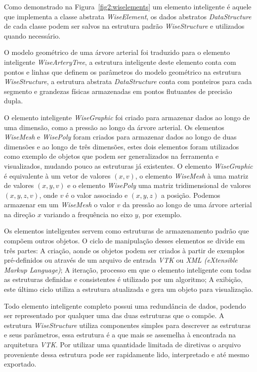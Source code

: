 \documentclass[a4paper,12pt]{monografia}
\theoremstyle{plain}
\theoremstyle{definition}
\theoremstyle{remark}
\begin{document}
Como demonstrado na Figura~\ref{fig2:wiselements} um elemento inteligente é aquele que implementa a classe abstrata \textit{WiseElement}, os dados abstratos \textit{DataStructure} de cada classe podem ser salvos na estrutura padrão \textit{WiseStructure} e utilizados quando necessário. 

O modelo geométrico de uma árvore arterial foi traduzido para o elemento inteligente \textit{WiseArteryTree}, a estrutura inteligente deste elemento conta com pontos e linhas que definem os parâmetros do modelo geométrico na estrutura \textit{WiseStructure}, a estrutura abstrata \textit{DataStructure} conta com ponteiros para cada segmento e grandezas físicas armazenadas em pontos flutuantes de precisão dupla.

O elemento inteligente \textit{WiseGraphic} foi criado para armazenar dados ao longo de uma dimensão, como a pressão ao longo da árvore arterial. Os elementos \textit{WiseMesh} e \textit{WisePoly} foram criados para armazenar dados ao longo de duas dimensões e ao longo de três dimensões, estes dois elementos foram utilizados como exemplo de objetos que podem ser generalizados na ferramenta e visualizados, mudando pouco as estruturas já existentes. O elemento \textit{WiseGraphic} é equivalente à um vetor de valores $(x,v)$, o elemento \textit{WiseMesh} à uma matriz de valores $(x,y,v)$ e o elemento \textit{WisePoly} uma matriz tridimensional de valores $(x,y,z,v)$, onde $v$ é o valor associado e $(x,y,z)$ a posição. Podemos armazenar em um \textit{WiseMesh} o valor $v$ da pressão ao longo de uma árvore arterial na direção $x$ variando a frequência no eixo $y$, por exemplo.

Os elementos inteligentes servem como estruturas de armazenamento padrão que compõem outros objetos. O ciclo de manipulação desses elementos se divide em três partes: A criação, aonde os objetos podem ser criados à partir de exemplos pré-definidos ou através de um arquivo de entrada \textit{VTK} ou \textit{XML (eXtensible Markup Language)}; A iteração, processo em que o elemento inteligente com todas as estruturas definidas e consistentes é utilizado por um algoritmo; A exibição,  este último ciclo utiliza a estrutura atualizada e gera um objeto para visualização.

Todo elemento inteligente completo possui uma redundância de dados, podendo ser representado por qualquer uma das duas estruturas que o compõe. A estrutura \textit{WiseStructure} utiliza componentes simples para descrever as estruturas e seus parâmetros, essa estrutura é a que mais se assemelha à encontrada na arquitetura \textit{VTK}. Por utilizar uma quantidade limitada de diretivas o arquivo proveniente dessa estrutura pode ser rapidamente lido, interpretado e até mesmo exportado.
\end{document}
